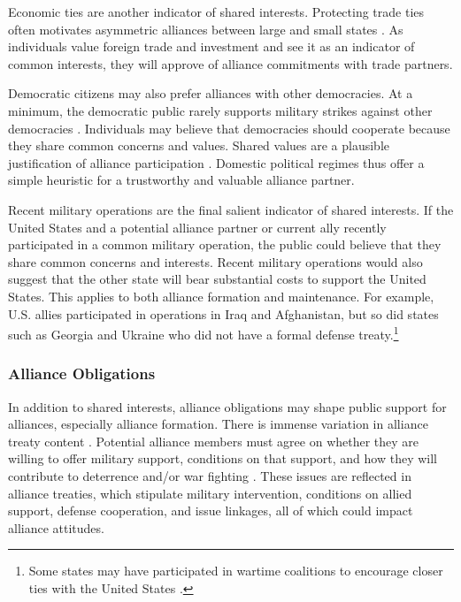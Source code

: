 \documentclass[12pt]{article}
\begin{document}
Economic ties are another indicator of shared interests. 
Protecting trade ties often motivates asymmetric alliances between large and small states \citep{Fordham2010}. 
As individuals value foreign trade and investment and see it as an indicator of common interests, they will approve of alliance commitments with trade partners.


Democratic citizens may also prefer alliances with other democracies. 
At a minimum, the democratic public rarely supports military strikes against other democracies \citep{TomzWeeks2013}. 
Individuals may believe that democracies should cooperate because they share common concerns and values. 
Shared values are a plausible justification of alliance participation \citep{Chuetal2021}. 
Domestic political regimes thus offer a simple heuristic for a trustworthy and valuable alliance partner. 


Recent military operations are the final salient indicator of shared interests. 
If the United States and a potential alliance partner or current ally recently participated in a common military operation, the public could believe that they share common concerns and interests. 
Recent military operations would also suggest that the other state will bear substantial costs to support the United States. 
This applies to both alliance formation and maintenance. 
For example, U.S. allies participated in operations in Iraq and Afghanistan, but so did states such as Georgia and Ukraine who did not have a formal defense treaty.\footnote{Some states may have participated in wartime coalitions to encourage closer ties with the United States \citep{GannonKent2020}.}



\subsubsection*{Alliance Obligations}


In addition to shared interests, alliance obligations may shape public support for alliances, especially alliance formation. 
There is immense variation in alliance treaty content \citep{Leedsetal2002}.
Potential alliance members must agree on whether they are willing to offer military support, conditions on that support, and how they will contribute to deterrence and/or war fighting \citep{Poast2019a}. 
These issues are reflected in alliance treaties, which stipulate military intervention, conditions on allied support, defense cooperation, and issue linkages, all of which could impact alliance attitudes. 
\end{document}
